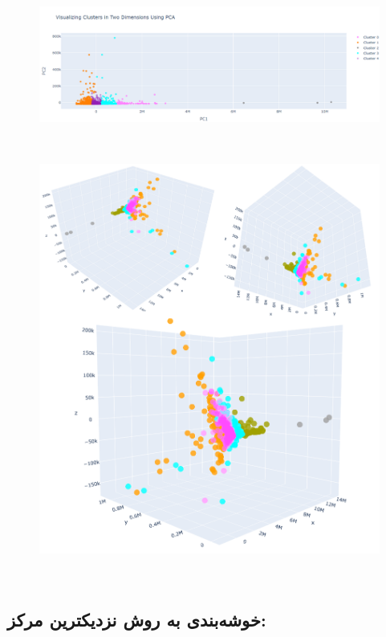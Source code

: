 \documentclass[10pt,onecolumn,a4paper]{article}
\begin{document}
\begin{figure}[h!]
        \centering
        \includegraphics[scale=0.4]{c2.png}
        \caption{  }  
    \end{figure}
\\
\vskip2cm
\begin{figure}[h!]
        \centering
        \includegraphics[scale=0.45]{c1.png}
        \caption{  }  
    \end{figure}
\\

 
\subsection{خوشه‌بندی به روش  نزدیکترین مرکز:}
\end{document}
